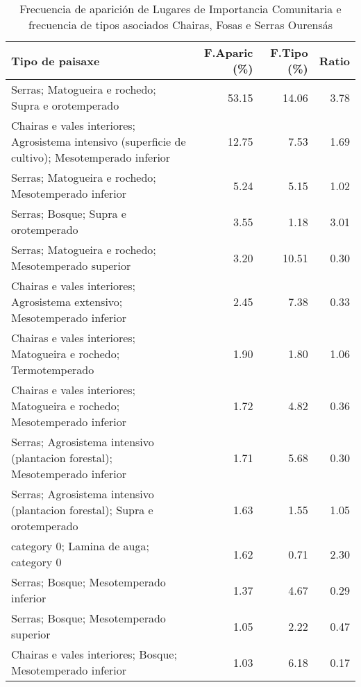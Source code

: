 \begin{table}[p]
\centering
\caption{Frecuencia de aparición de Lugares de Importancia Comunitaria e frecuencia de tipos asociados Chairas, Fosas e Serras Ourensás} 
\label{vnatura8}
\begin{tabular}{lrrr}
  \hline
Tipo de paisaxe & F.Aparic (\%) & F.Tipo (\%) & Ratio \\ 
  \hline
Serras; Matogueira e rochedo; Supra e orotemperado & 53.15 & 14.06 & 3.78 \\ 
  Chairas e vales interiores; Agrosistema intensivo (superficie de cultivo); Mesotemperado inferior & 12.75 & 7.53 & 1.69 \\ 
  Serras; Matogueira e rochedo; Mesotemperado inferior & 5.24 & 5.15 & 1.02 \\ 
  Serras; Bosque; Supra e orotemperado & 3.55 & 1.18 & 3.01 \\ 
  Serras; Matogueira e rochedo; Mesotemperado superior & 3.20 & 10.51 & 0.30 \\ 
  Chairas e vales interiores; Agrosistema extensivo; Mesotemperado inferior & 2.45 & 7.38 & 0.33 \\ 
  Chairas e vales interiores; Matogueira e rochedo; Termotemperado & 1.90 & 1.80 & 1.06 \\ 
  Chairas e vales interiores; Matogueira e rochedo; Mesotemperado inferior & 1.72 & 4.82 & 0.36 \\ 
  Serras; Agrosistema intensivo (plantacion forestal); Mesotemperado inferior & 1.71 & 5.68 & 0.30 \\ 
  Serras; Agrosistema intensivo (plantacion forestal); Supra e orotemperado & 1.63 & 1.55 & 1.05 \\ 
  category 0; Lamina de auga; category 0 & 1.62 & 0.71 & 2.30 \\ 
  Serras; Bosque; Mesotemperado inferior & 1.37 & 4.67 & 0.29 \\ 
  Serras; Bosque; Mesotemperado superior & 1.05 & 2.22 & 0.47 \\ 
  Chairas e vales interiores; Bosque; Mesotemperado inferior & 1.03 & 6.18 & 0.17 \\ 
   \hline
\end{tabular}
\end{table}
